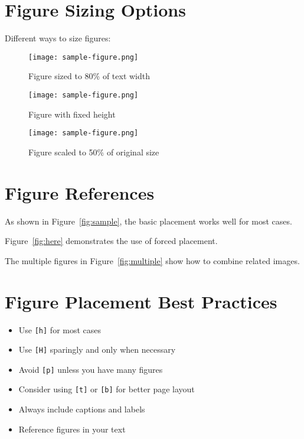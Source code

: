 \documentclass{article}
\begin{document}
\section{Figure Sizing Options}
Different ways to size figures:

\begin{figure}[h]
\centering
\texttt{[image: sample-figure.png]}
\caption{Figure sized to 80\% of text width}
\label{fig:width}
\end{figure}

\begin{figure}[h]
\centering
\texttt{[image: sample-figure.png]}
\caption{Figure with fixed height}
\label{fig:height}
\end{figure}

\begin{figure}[h]
\centering
\texttt{[image: sample-figure.png]}
\caption{Figure scaled to 50\% of original size}
\label{fig:scale}
\end{figure}

\section{Figure References}
As shown in Figure~\ref{fig:sample}, the basic placement works well for most cases.

Figure~\ref{fig:here} demonstrates the use of forced placement.

The multiple figures in Figure~\ref{fig:multiple} show how to combine related images.

\section{Figure Placement Best Practices}
\begin{itemize}
    \item Use \texttt{[h]} for most cases
    \item Use \texttt{[H]} sparingly and only when necessary
    \item Avoid \texttt{[p]} unless you have many figures
    \item Consider using \texttt{[t]} or \texttt{[b]} for better page layout
    \item Always include captions and labels
    \item Reference figures in your text
\end{itemize}
\end{document}
